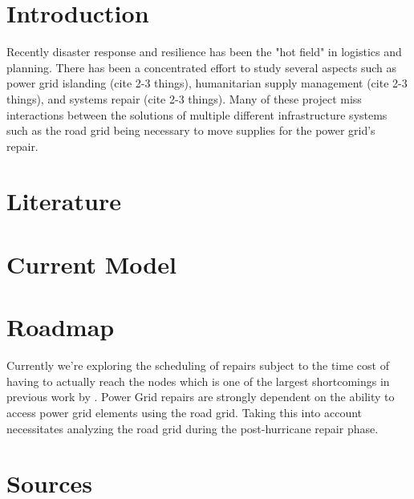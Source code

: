 \documentclass{article}
\begin{document}
	\section{Introduction}
	Recently disaster response and resilience has been the "hot field" in logistics and planning. There has been a concentrated effort to study several aspects such as power grid islanding (cite 2-3 things), humanitarian supply management (cite 2-3 things), and systems repair (cite 2-3 things). Many of these project miss interactions between the solutions of multiple different infrastructure systems such as the road grid being necessary to move supplies for the power grid's repair. 
	\section{Literature}
	
	\section{Current Model}
	\section{Roadmap}
	Currently we're exploring the scheduling of repairs subject to the time cost of having to actually reach the nodes which is one of the largest shortcomings in previous work by \cite{NPSMasters}. Power Grid repairs are strongly dependent on the ability to access power grid elements using the road grid. Taking this into account necessitates analyzing the road grid during the post-hurricane repair phase.
	\section{Sources}
\end{document}
